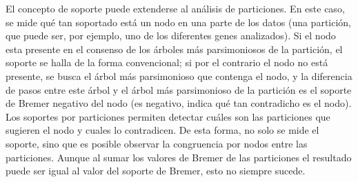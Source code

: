 El concepto de soporte puede extenderse al an\'alisis de particiones. En este caso, se mide qu\'e tan soportado est\'a un nodo en una parte de los datos (una partici\'on, que puede ser, por ejemplo, uno de los diferentes genes analizados). Si el nodo esta presente en el consenso de los \'arboles m\'as parsimoniosos de la partici\'on, el soporte se halla de la forma convencional; si por el contrario el nodo no est\'a presente, se busca el \'arbol m\'as parsimonioso que contenga el nodo, y la diferencia de pasos entre este \'arbol y el \'arbol m\'as parsimonioso de la partici\'on es el soporte de Bremer negativo del nodo (es negativo, indica qu\'e tan contradicho es el nodo). Los soportes por particiones permiten detectar cu\'ales son las particiones que sugieren el nodo y cuales lo contradicen. De esta forma, no solo se mide el soporte, sino que es posible observar la congruencia por nodos entre las particiones. Aunque al sumar los valores de Bremer de las particiones el resultado puede ser igual al valor del soporte de Bremer, esto no siempre sucede.
